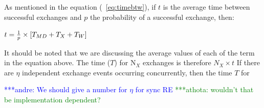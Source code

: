 \documentclass{rspublic}
\newcommand{\alnote}[1]{ {\textcolor{blue} { ***andre: #1 }}}
\newcommand{\athotanote}[1]{ {\textcolor{green} { ***athota: #1 }}}
\newcommand{\alnote}[1]{}
\newcommand{\athotanote}[1]{}
\begin{document}
As mentioned in the equation (~\ref{eq:timebtw}), if $t$ is the average time between successful exchanges and $p$ the probability of a successful exchange, then:

$t =  {1 \over p} \times {[T_{MD} + T_{X} + T_{W}]}$

It should be noted that we are discussing the average values of each of the term in the equation above.
The time ($T$) for N$_{X}$ exchanges is therefore $N_{X} \times t$
If there are $\eta$ independent exchange events occurring concurrently, then the time $T$ for 




\alnote{We should give a number for $\eta$ for sync RE}\athotanote{wouldn't that be implementation dependent?}
\end{document}
